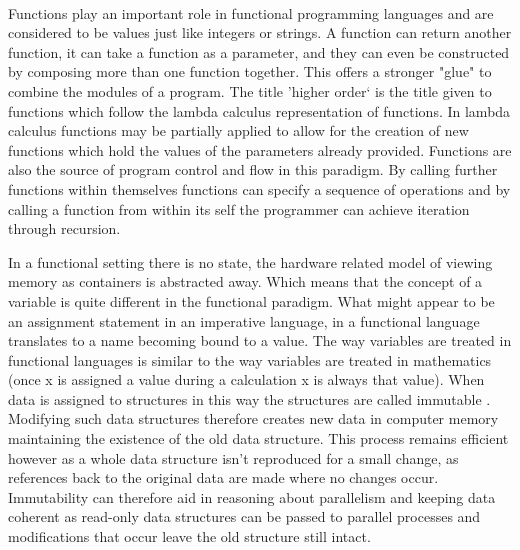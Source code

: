 \documentclass[main.tex]{subfiles}
\begin{document}
\paragraph{}Functions play an important role in functional programming languages and are considered to be values just like integers or strings. A function can return another function, it can take a function as a parameter, and they can even be constructed by composing more than one function together. This offers a stronger "glue" to combine the modules of a program. The title 'higher order` is the title given to functions which follow the lambda calculus representation of functions\cite{Duame2002}. In lambda calculus functions may be partially applied to allow for the creation of new functions which hold the values of the parameters already provided. Functions are also the source of program control and flow in this paradigm. By calling further functions within themselves functions can specify a sequence of operations and by calling a function from within its self the programmer can achieve iteration through recursion.

In a functional setting there is no state, the hardware related model of viewing memory as containers is abstracted away. Which means that the concept of a variable is quite different in the functional paradigm. What might appear to be an assignment statement in an imperative language, in a functional language translates to a name becoming bound to a value. The way variables are treated in functional languages is similar to the way variables are treated in mathematics (once x is assigned a value during a calculation x is always that value). When data is assigned to structures in this way the structures are called immutable \cite{Lipovaca2010}. Modifying such data structures therefore creates new data in computer memory maintaining the existence of the old data structure. This process remains efficient however as a whole data structure isn't reproduced for a small change, as references back to the original data are made where no changes occur\cite{Okasaki1999}. Immutability can therefore aid in reasoning about parallelism and keeping data coherent as read-only data structures can be passed to parallel processes and modifications that occur leave the old structure still intact.
\end{document}
